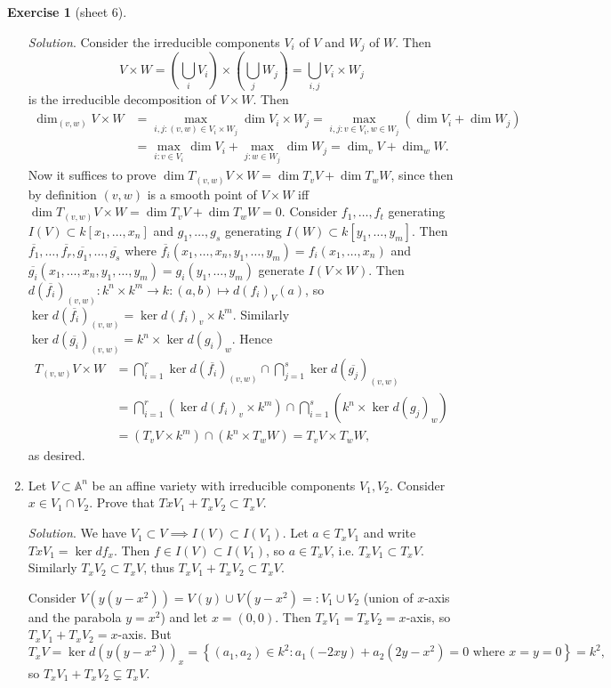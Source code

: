 \documentclass{article}
\newcommand{\A}{\mathbb{A}}
\theoremstyle{definition}
\newtheorem{exe}[defn]{Exercise}
\begin{document}
\begin{exe}[sheet 6]
\begin{enumerate}
\textit{Solution}. Consider the irreducible components $V_i$ of $V$ and $W_j$ of $W$. Then
\[
V\times W=\left(\bigcup_i V_i\right)\times \left(\bigcup_j W_j\right)=\bigcup_{i,j}V_i\times W_j
\]
is the irreducible decomposition of $V\times W$. Then
\[
\begin{aligned}
\dim_{(v,w)}V\times W&=\max_{i,j:(v,w)\in V_i\times W_j}\dim V_i\times W_j=\max_{i,j:v\in V_i,w\in W_j} \left(\dim V_i+\dim W_j\right)\\
&=\max_{i:v\in V_i}\dim V_i+\max_{j:w\in W_j}\dim W_j=\dim_vV+\dim_wW.
\end{aligned}
\]
Now it suffices to prove $\dim T_{(v,w)}V\times W=\dim T_vV+\dim T_wW$, since then by definition $(v,w)$ is a smooth point of $V\times W$ iff $\dim T_{(v,w)}V\times W=\dim T_vV+\dim T_wW=0$. Consider $f_1,\ldots,f_t$ generating $I(V)\subset k[x_1,\ldots,x_n]$ and $g_1,\ldots,g_s$ generating $I(W)\subset k[y_1,\ldots,y_m]$. Then $\overline{f_1},\ldots,\overline{f_r},\overline{g_1},\ldots,\overline{g_s}$ where $\overline{f_i}(x_1,\ldots,x_n,y_1,\ldots,y_m)=f_i(x_1,\ldots,x_n)$ and $\overline{g_i}(x_1,\ldots,x_n,y_1,\ldots,y_m)=g_i(y_1,\ldots,y_m)$ generate $I(V\times W)$. Then $d\left(\overline{f_i}\right)_{(v,w)}:k^n\times k^m\rightarrow k:(a,b)\mapsto d(f_i)_V(a)$, so $\ker d\left(\overline{f_i}\right)_{(v,w)}=\ker d(f_i)_v\times k^m$. Similarly $\ker d\left(\overline{g_i}\right)_{(v,w)}=k^n\times\ker d(g_i)_w$. Hence
\[
\begin{aligned}
T_{(v,w)}V\times W&=\bigcap_{i=1}^r \ker d\left(\overline{f_i}\right)_{(v,w)}\cap \bigcap_{j=1}^s \ker d\left(\overline{g_j}\right)_{(v,w)} \\
&=\bigcap_{i=1}^r \left(\ker d(f_i)_v\times k^m\right)\cap \bigcap_{i=1}^s \left(k^n\times \ker d(g_j)_w\right) \\
&=\left(T_vV\times k^m\right)\cap\left(k^n\times T_wW\right)=T_vV\times T_wW,
\end{aligned}
\]
as desired.

\item Let $V\subset\A^n$ be an affine variety with irreducible components $V_1,V_2$. Consider $x\in V_1\cap V_2$. Prove that $TxV_1+T_xV_2\subset T_xV$.

\textit{Solution}. We have $V_1\subset V\implies I(V)\subset I(V_1)$. Let $a\in T_xV_1$ and write $TxV_1=\ker df_x$. Then $f\in I(V)\subset I(V_1)$, so $a\in T_xV$, i.e. $T_xV_1\subset T_xV$. Similarly $T_xV_2\subset T_xV$, thus $T_xV_1+T_xV_2\subset T_xV$.

Consider $V(y(y-x^2))=V(y)\cup V(y-x^2)=:V_1\cup V_2$ (union of $x$-axis and the parabola $y=x^2$) and let $x=(0,0)$. Then $T_xV_1=T_xV_2=x$-axis, so $T_xV_1+T_xV_2=x$-axis. But
\[
T_xV=\ker d(y(y-x^2))_x=\left\{(a_1,a_2)\in k^2:a_1(-2xy)+a_2(2y-x^2)=0\text{ where }x=y=0\right\}=k^2,
\]
so $T_xV_1+T_xV_2\subsetneq T_xV$.


\end{enumerate}
\end{exe}
\end{document}
